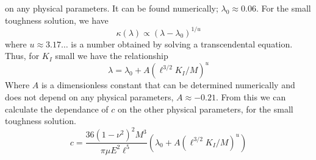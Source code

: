 \documentclass{article}
\begin{document}
on any physical parameters. It can be found numerically; 
$\lambda_0 \approx 0.06$. For the small toughness solution, we have
\[\kappa(\lambda) \propto (\lambda - \lambda_0)^{1/u}\]
where $u\approx 3.17\dots$ is a number obtained by solving a transcendental
equation. Thus, for $K_I$ small we have the relationship
\[ \lambda = \lambda_0 + A(\ell^{3/2} K_I / M)^u \]
Where $A$ is a dimensionless constant that can be determined numerically
and does not depend on any physical parameters, $A \approx -0.21$. From this
we can calculate the dependance of $c$ on the other physical parameters, for 
the small toughness solution.
\[ c = \frac{36(1-\nu^2)^2M^3}{\pi \mu E^2 \ell^5}\left(\lambda_0 + A
(\ell^{3/2}K_I/M)^u \right) \]
%
%
%
%
%
%
\end{document}
